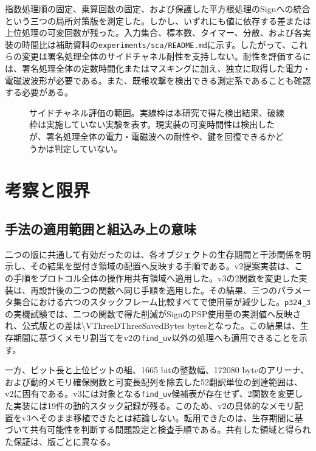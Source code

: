 \documentclass[a4paper,10pt]{ltjsarticle}
\theoremstyle{definition}
\theoremstyle{remark}
\begin{document}
指数処理順の固定、乗算回数の固定、および保護した平方根処理のSignへの統合という三つの局所対策版を測定した。しかし、いずれにも値に依存する差または上位処理の可変回数が残った。入力集合、標本数、タイマー、分散、および各実装の時間比は補助資料の\texttt{experiments/sca/README.md}に示す。したがって、これらの変更は署名処理全体のサイドチャネル耐性を支持しない。耐性を評価するには、署名処理全体の定数時間化またはマスキングに加え、独立に取得した電力・電磁波波形が必要である。また、既報攻撃を検出できる測定系であることも確認する必要がある。

\begin{figure}[H]
  \centering
  
  \caption{サイドチャネル評価の範囲。実線枠は本研究で得た検出結果、破線枠は実施していない実験を表す。現実装の可変時間性は検出したが、署名処理全体の電力・電磁波への耐性や、鍵を回復できるかどうかは判定していない。}
  \label{fig:sca-evidence}
\end{figure}

\section{考察と限界}
\label{sec:discussion}

\subsection{手法の適用範囲と組込み上の意味}

二つの版に共通して有効だったのは、各オブジェクトの生存期間と干渉関係を明示し、その結果を型付き領域の配置へ反映する手順である。v2提案実装は、この手順をプロトコル全体の操作用共有領域へ適用した。v3の2関数を変更した実装は、再設計後の二つの関数へ同じ手順を適用した。その結果、三つのパラメータ集合における六つのスタックフレーム比較すべてで使用量が減少した。\texttt{p324\_3}の実機試験では、二つの関数で得た削減がSignのPSP使用量の実測値へ反映され、公式版との差は\num{\VThreeDThreeSavedBytes} bytesとなった。この結果は、生存期間に基づくメモリ割当てをv2の\texttt{find\_uv}以外の処理へも適用できることを示す。

一方、ビット長と上位ビットの組、1665 bitの整数幅、\num{172080} byteのアリーナ、および動的メモリ確保関数と可変長配列を除去した52翻訳単位の到達範囲は、v2に固有である。v3には対象となる\texttt{find\_uv}候補表が存在せず、2関数を変更した実装には19件の動的スタック記録が残る。このため、v2の具体的なメモリ配置をv3へそのまま移植できたとは結論しない。転用できたのは、生存期間に基づいて共有可能性を判断する問題設定と検査手順である。共有した領域と得られた保証は、版ごとに異なる。
\end{document}
